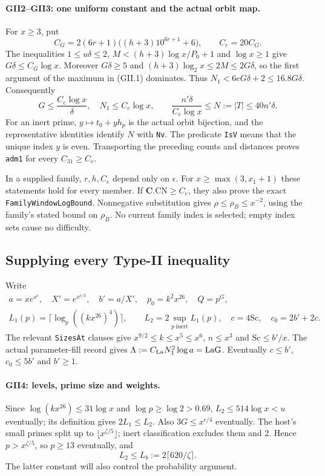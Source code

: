 \paragraph{GII2--GII3: one uniform constant and the actual orbit map.}
For $x\ge3$, put
\[
 C_G=2(6r+1)\bigl((h+3)10^{6r+1}+6\bigr),\qquad C_e=20C_G.
\]
The inequalities $1\le u\delta\le2$, $M< (h+3)\log x/P_0+1$ and
$\log x\ge1$ give $G\delta\le C_G\log x$. Moreover $G\delta\ge5$ and
$(h+3)\log_2x\le2M\le2G\delta$, so the first argument of the maximum
in (GII.1) dominates. Thus $N_1<6eG\delta+2\le16.8G\delta$. Consequently
\[
 G\le\frac{C_e\log x}{\delta},\quad N_1\le C_e\log x,\qquad
 \frac{n'\delta}{C_e\log x}\le N:=|T|\le40n'\delta.
 \tag{GII.3}
\]
For an inert prime, $y\mapsto t_0+yh_p$ is the actual orbit bijection,
and the representative identities identify $N$ with \texttt{Nv}.
The predicate \texttt{IsV} means that the unique index $y$ is even.
Transporting the preceding counts and distances proves
\texttt{adm1} for every $C_{31}\ge C_e$.

In a supplied family, $r,h,C_e$ depend only on $\epsilon$. For
$x\ge\max(3,x_1+1)$ these statements hold for every member. If
$\mathbf C.\mathrm{CN}\ge C_e$, they also prove the exact
\texttt{FamilyWindowLogBound}. Nonnegative substitution gives
$\rho\le\rho_B\le x^{-2}$, using the family's stated bound on $\rho_B$.
No current family index is selected; empty index sets cause no difficulty.

\subsection{Supplying every Type-II inequality}

Write
\[
\begin{gathered}
 a=xe^{x^\epsilon},\quad X'=e^{x^{\epsilon/3}},\quad b'=a/X',
 \quad p_0=k^2x^{26},\quad Q=p^G,\\
 L_1(p)=\lceil\log_p((kx^{26})^4)\rceil,\qquad
 L_2=2\sup_{p\ \mathrm{inert}}L_1(p),\quad c=4\mathrm{Sc},\quad c_0=2b'+2c.
\end{gathered}\tag{GII.4}
\]
The relevant \texttt{SizesAt} clauses give
$x^{9/2}\le k\le x^5\le x^6$, $n\le x^3$ and $\mathrm{Sc}\le b'/x$.
The actual parameter-fill record gives
$\Lambda:=C_{\rm La}N_1^2\log a=\mathrm{LaG}$.
Eventually $c\le b'$, $c_0\le5b'$ and $b'\ge1$.

\paragraph{GII4: levels, prime size and weights.}
Since $\log(kx^{26})\le31\log x$ and $\log p\ge\log2>0.69$,
$L_2\le514\log x<u$ eventually; its definition gives $2L_1\le L_2$.
Also $3G\le x^{\epsilon/4}$ eventually. The host's small primes split
up to $\lfloor x^{\zeta/5}\rfloor$; inert classification excludes them
and $2$. Hence $p>x^{\zeta/5}$, so $p\ge13$ eventually, and
\[
 L_2\le L_b:=2\lceil620/\zeta\rceil.\tag{GII.5}
\]
The latter constant will also control the probability argument.

